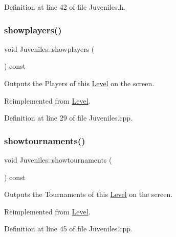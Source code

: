 Definition at line 42 of file Juveniles.\+h.

\hypertarget{class_juveniles_ae66be24e5e17ce8583ff59c45ff4a772}{}\label{class_juveniles_ae66be24e5e17ce8583ff59c45ff4a772} 
\subsubsection{\texorpdfstring{showplayers()}{showplayers()}}
{\footnotesize\ttfamily void Juveniles\+::showplayers (\begin{DoxyParamCaption}{ }\end{DoxyParamCaption}) const\hspace{0.3cm}{\ttfamily [virtual]}}



Outputs the Players of this \hyperlink{class_level}{Level} on the screen. 



Reimplemented from \hyperlink{class_level_a40d22b376e72950a07de5e0a9e288029}{Level}.



Definition at line 29 of file Juveniles.\+cpp.

\hypertarget{class_juveniles_a8502c64d6a2cefda618003da25db3cda}{}\label{class_juveniles_a8502c64d6a2cefda618003da25db3cda} 
\subsubsection{\texorpdfstring{showtournaments()}{showtournaments()}}
{\footnotesize\ttfamily void Juveniles\+::showtournaments (\begin{DoxyParamCaption}{ }\end{DoxyParamCaption}) const\hspace{0.3cm}{\ttfamily [virtual]}}



Outputs the Tournaments of this \hyperlink{class_level}{Level} on the screen. 



Reimplemented from \hyperlink{class_level_a757c4547f3b8f7c7ecb02c7e0e6cd7c9}{Level}.



Definition at line 45 of file Juveniles.\+cpp.

\hypertarget{class_juveniles_a168139683f59bca317a7d55cd33be5ac}{}\label{class_juveniles_a168139683f59bca317a7d55cd33be5ac} 

